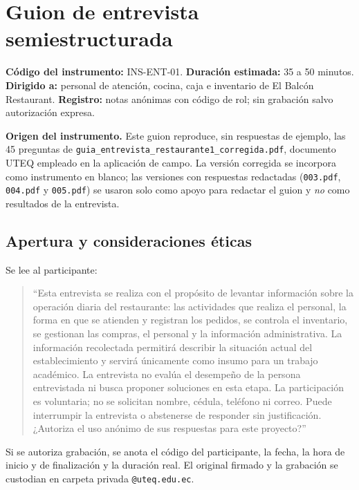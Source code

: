 \providecommand{\iquest}[1]{¿#1}
\section{Guion de entrevista semiestructurada}
\sloppy

\textbf{C\'odigo del instrumento:} INS-ENT-01. \textbf{Duraci\'on estimada:} 35 a 50 minutos.
\textbf{Dirigido a:} personal de atenci\'on, cocina, caja e inventario de
El Balcón Restaurant. \textbf{Registro:} notas an\'onimas con c\'odigo de rol; sin
grabaci\'on salvo autorizaci\'on expresa.

\textbf{Origen del instrumento.} Este guion reproduce, sin respuestas de ejemplo,
las 45 preguntas de \texttt{guia\_entrevista\_restaurante1\_corregida.pdf},
documento UTEQ empleado en la aplicaci\'on de campo. La versi\'on corregida se
incorpora como instrumento en blanco; las versiones con respuestas redactadas
(\texttt{003.pdf}, \texttt{004.pdf} y \texttt{005.pdf}) se usaron solo como apoyo para redactar el
guion y \emph{no} como resultados de la entrevista.

\subsection*{Apertura y consideraciones \'eticas}
Se lee al participante:

\begin{quote}
\small
``Esta entrevista se realiza con el prop\'osito de levantar informaci\'on sobre
la operaci\'on diaria del restaurante: las actividades que realiza el personal,
la forma en que se atienden y registran los pedidos, se controla el inventario,
se gestionan las compras, el personal y la informaci\'on administrativa. La
informaci\'on recolectada permitir\'a describir la situaci\'on actual del
establecimiento y servir\'a \'unicamente como insumo para un trabajo acad\'emico.
La entrevista no eval\'ua el desempe\~no de la persona entrevistada ni busca
proponer soluciones en esta etapa. La participaci\'on es voluntaria; no se
solicitan nombre, c\'edula, tel\'efono ni correo. Puede interrumpir la entrevista
o abstenerse de responder sin justificaci\'on. \iquest{Autoriza el uso an\'onimo
de sus respuestas para este proyecto?}''
\end{quote}

Si se autoriza grabaci\'on, se anota el c\'odigo del participante, la fecha, la
hora de inicio y de finalizaci\'on y la duraci\'on real. El original firmado y la
grabaci\'on se custodian en carpeta privada \texttt{@uteq.edu.ec}.

